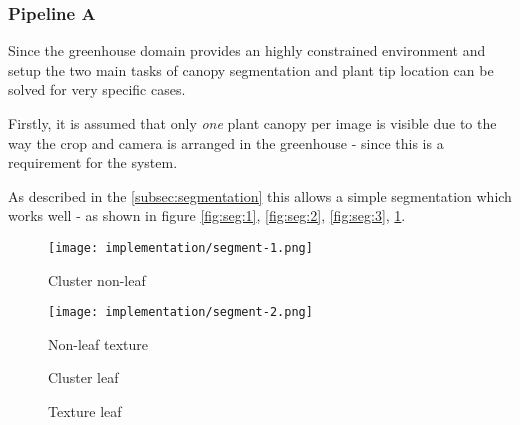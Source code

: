 \subsubsection{Pipeline A}

Since the greenhouse domain provides an highly constrained environment and setup the two main tasks
of canopy segmentation and plant tip location can be solved for very specific cases.

Firstly, it is assumed that only \textit{one} plant canopy per image is visible due to the way the
crop and camera is arranged in the greenhouse - since this is a requirement for the system.

As described in the \ref{subsec:segmentation} this allows a simple segmentation which works well -
as shown in figure \ref{fig:seg:1}, \ref{fig:seg:2}, \ref{fig:seg:3}, \ref{fig:seg:4}.

\begin{figure}[H]
    \centering
    \begin{minipage}[b]{0.24\textwidth}
        \texttt{[image: implementation/segment-1.png]}
        \caption{Cluster non-leaf}
        \label{fig:seg:1}
    \end{minipage}
    \hfill
    \begin{minipage}[b]{0.24\textwidth}
        \texttt{[image: implementation/segment-2.png]}
        \caption{Non-leaf texture}
        \label{fig:seg:2}
    \end{minipage}
    \hfill
    \begin{minipage}[b]{0.24\textwidth}
        \caption{Cluster leaf}
        \label{fig:seg:3}
    \end{minipage}
    \hfill
    \begin{minipage}[b]{0.24\textwidth}
        \caption{Texture leaf}
        \label{fig:seg:4}
    \end{minipage}
\end{figure}